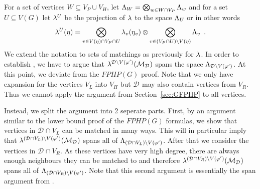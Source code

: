 \documentclass{article}
\newcommand{\eqperiod}{\enspace .}
\newcommand{\refsec}[1]{Section~\ref{#1}}
\newcommand{\formulaformat}[1]{\mathit{#1}}
\newcommand{\graphfphpnot}[1][G]{\formulaformat{FPHP}({#1})}
\newcommand{\GFPHP}{G\text{-}FPHP}
\renewcommand{\GFPHP}{\graphfphpnot[G]}
\newcommand{\V}[1][]{V_{#1}}
\newcommand{\Vl}{\V[L]}
\newcommand{\Vr}{\V[R]}
\newcommand{\Vp}{\V[P]}
\newcommand{\Vh}{\V[H]}
\newcommand{\linspace}[1][]{\ensuremath \Lambda_{{#1}}}
\newcommand{\linmap}[1][]{\ensuremath \lambda_{{#1}}}
\newcommand{\linmapof}[2][]{\linmap[#1](#2)}
\newcommand{\linmapl}[2][]{\ensuremath \lambda^{{#2}}_{{#1}}}
\newcommand{\linmaplof}[3][]{\linmapl[#1]{#2}(#3)}
\newcommand{\diffclosure}[1][]{D_{{#1}}}
\renewcommand{\diffclosure}[1][]{\mathcal{D}_{{#1}}}
\newcommand{\vmatch}[1]{V(#1)}
\newcommand{\matchb}{\varphi'}
\newcommand{\matche}{\eta}
\newcommand{\matchings}[1][]{\ensuremath \mathcal{M}_{{#1}}}
\newcommand{\tensor}{\ensuremath \otimes}
\newcommand{\bigtensor}{\ensuremath \bigotimes}
\numberwithin{equation}{section}
\begin{document}
  For a set of vertices
  $W \subseteq \Vp \cup \Vh$, let
  $
    \linspace[W] = 
    \bigtensor_{w \in W \cap \Vp}
    \linspace[w] $ 
  and 
  for a set $U \subseteq V(G)$
  let $\linmapl{U}$ be the projection of $\linmap$ to the space
  $\linspace[U]$ or in other words
  \begin{align}
    \linmaplof{U}{\matche} = 
    \bigtensor_{v \in V(\matche) \cap \Vp \cap U}
    \linmapof[v]{\matche_v} \tensor \bigtensor_{v \in (\Vp \cap U)
    \setminus V(\matche)} \linspace[v] \eqperiod
  \end{align}
  We extend the notation to sets of matchings as previously 
  for $\linmap$.
  In order to establish , we have to argue that 
  $\linmaplof{\diffclosure \setminus
    V(\matchb)}{\matchings[\diffclosure]}$ 
  spans the space 
  $\linspace[\diffclosure \setminus \vmatch{\matchb}]$.
  At this point, we deviate from the $\GFPHP$ proof.
  Note that we only have expansion for the vertices $\Vl$ into $\Vh$
  but $\diffclosure$ may also contain vertices from $\Vr$. Thus we
  cannot apply the argument from \refsec{sec:GFPHP} to all vertices. 

  Instead, we split the argument into 2 seperate parts.
  First, by an argument similar to the lower bound proof of the
  $\GFPHP$ formulas, we show that vertices in $\diffclosure \cap \Vl$ 
  can be matched in many ways. This will in particular imply that 
  $\linmaplof{(\diffclosure \cap \Vl) \setminus V(\matchb)}
  {\matchings[\diffclosure]}$ spans all of
  $\linspace[(\diffclosure \cap \Vl) \setminus \vmatch{\matchb}]$. 
  After that we consider the vertices in $\diffclosure \cap \Vr$. 
  As these
  vertices have very high degree, there are always enough
  neighbours they can be matched to and therefore
  $\linmaplof{(\diffclosure \cap \Vr) \setminus \vmatch{\matchb}}
  {\matchings[\diffclosure]}$ spans all of
  $\linspace[(\diffclosure \cap \Vr) \setminus \vmatch{\matchb}]$. 
  Note that this second argument is essentially the span argument from
  \cite{Razborov03ResolutionLowerBoundsWFPHP}.
  
\end{document}
